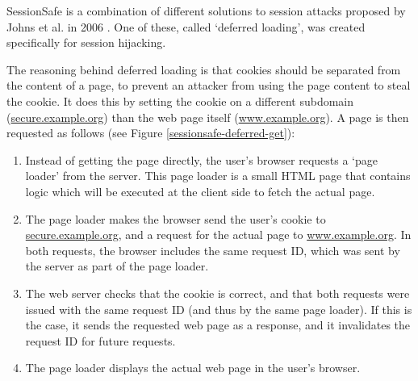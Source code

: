 SessionSafe is a combination of different solutions to session attacks proposed by Johns et al. in 2006 \cite{Johns2006}. One of these, called `deferred loading', was created specifically for session hijacking.

The reasoning behind deferred loading is that cookies should be separated from the content of a page, to prevent an attacker from using the page content to steal the cookie. It does this by setting the cookie on a different subdomain (\url{secure.example.org}) than the web page itself (\url{www.example.org}). A page is then requested as follows (see Figure \ref{sessionsafe-deferred-get}):
\begin{enumerate}
	\item Instead of getting the page directly, the user's browser requests a `page loader' from the server. This page loader is a small HTML page that contains logic which will be executed at the client side to fetch the actual page.
	\item The page loader makes the browser send the user's cookie to \url{secure.example.org}, and a request for the actual page to \url{www.example.org}. In both requests, the browser includes the same request ID, which was sent by the server as part of the page loader.
	\item The web server checks that the cookie is correct, and that both requests were issued with the same request ID (and thus by the same page loader). If this is the case, it sends the requested web page as a response, and it invalidates the request ID for future requests.
	\item The page loader displays the actual web page in the user's browser.
\end{enumerate}

